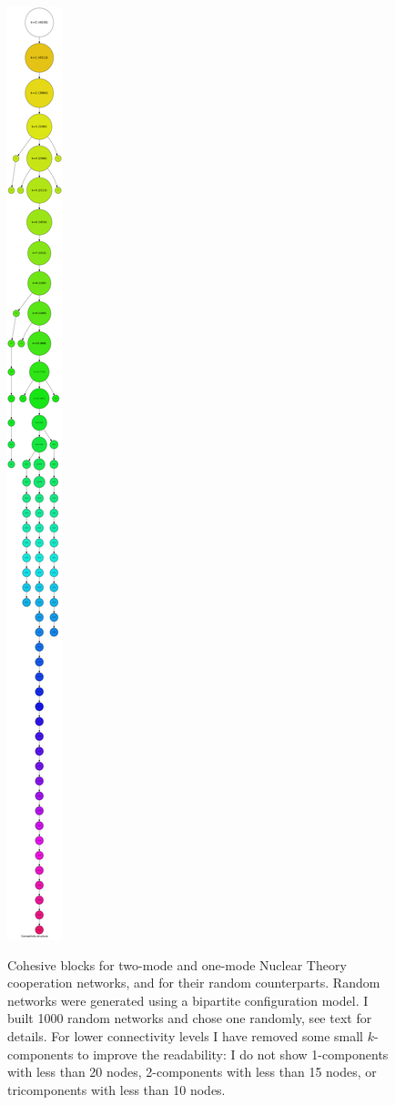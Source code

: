 \begin{landscape}
\begin{figure}[p]
{\includegraphics[scale=0.07]{figures/cohesive_blocks_nucl_th_1mode_random}
}

\caption[Cohesive blocks for two-mode and one-mode Science networks.]{Cohesive blocks for two-mode and one-mode Nuclear Theory cooperation networks, and for their random counterparts. Random networks were generated using a bipartite configuration model. I built 1000 random networks and chose one randomly, see text for details. For lower connectivity levels I have removed some small $k$-components to improve the readability: I do not show 1-components with less than 20 nodes, 2-components with less than 15 nodes, or tricomponents with less than 10 nodes.}
\label{fig:cb_nucl_all}
\end{figure}
\end{landscape}

